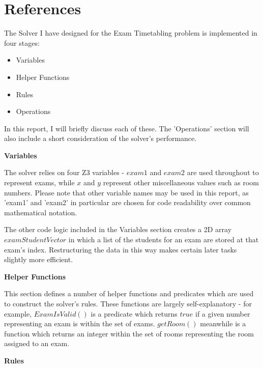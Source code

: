 \documentclass[11pt]{article}
\begin{document}

	\section{References}
	
	

	\newpage


	The Solver I have designed for the Exam Timetabling problem is implemented in four stages:
	
	\begin{itemize}
		\item Variables
		\item Helper Functions
		\item Rules
		\item Operations
	\end{itemize}

	In this report, I will briefly discuss each of these. The 'Operations' section will also include a short consideration of the solver's performance.\newline

	\textbf{Variables}

	The solver relies on four Z3 variables - \(exam1\) and \(exam2\) are used throughout to represent exams, while \(x\) and \(y\) represent other miscellaneous values such as room numbers. Please note that other variable names may be used in this report, as 'exam1' and 'exam2' in particular are chosen for code readability over common mathematical notation.

	The other code logic included in the Variables section creates a 2D array \(examStudentVector\) in which a list of the students for an exam are stored at that exam's index. Restructuring the data in this way makes certain later tasks slightly more efficient.\newline

	\textbf{Helper Functions}

	This section defines a number of helper functions and predicates which are used to construct the solver's rules. These functions are largely self-explanatory - for example, \(ExamIsValid()\) is a predicate which returns \(true\) if a given number representing an exam is within the set of exams. \(getRoom()\) meanwhile is a function which returns an integer within the set of rooms representing the room assigned to an exam.\newline

	\textbf{Rules}
	
\end{document}
